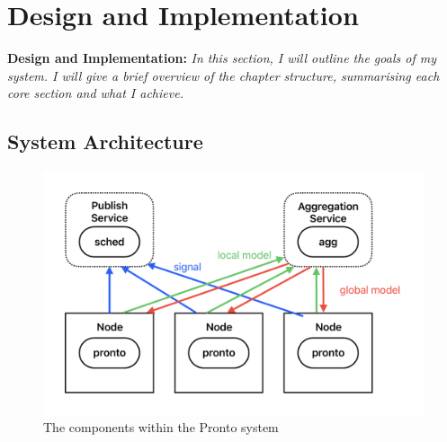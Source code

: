 \chapter{Design and Implementation}
\begin{tcolorbox}[boxsep=0mm,left=2.5mm,right=2.5mm]
    \textbf{Design and Implementation:} {\em In this section, I will outline the
    goals of my system. I will give a brief overview of the chapter structure,
    summarising each core section and what I achieve.}
\end{tcolorbox}

\section{System Architecture}
\label{sec:sys-arch}
\begin{figure}[h]
    \centering
    \includegraphics[width=\textwidth]{images/system.pdf}
    \caption{The components within the Pronto system}
    \label{pronto-system}
\end{figure}

